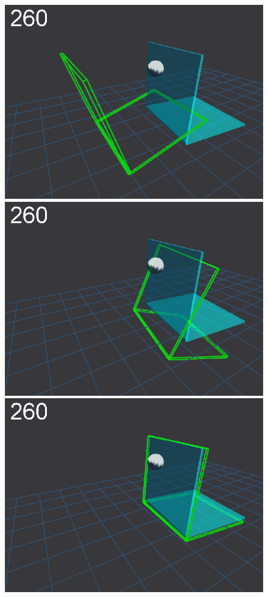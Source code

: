 \begin{figure}[tb]
\centerline{
\includegraphics[width=\imgBXwid]{images/B1_1exp_20_4}
\includegraphics[width=\imgBXwid]{images/B1_2exp_20_4}
\includegraphics[width=\imgBXwid]{images/B1_3exp_20_4}
}
\end{figure}

